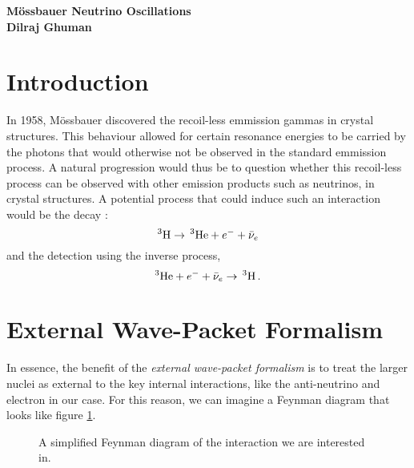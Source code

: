 \documentclass[10pt]{article}
\begin{document}
\begin{center}
  {\Large \bf M\"{o}ssbauer Neutrino Oscillations}\\
  {\small \bf Dilraj Ghuman}
\end{center}
\vspace{2em}

\section{Introduction}

In 1958, M\"{o}ssbauer discovered the recoil-less emmission gammas in crystal structures. This behaviour allowed for certain resonance energies to be carried by the photons that would otherwise not be observed in the standard emmission process. A natural progression would thus be to question whether this recoil-less process can be observed with other emission products such as neutrinos, in crystal structures. A potential process that could induce such an interaction would be the decay :
\[^{3} \textnormal{H} \to\,  ^{3}\textnormal{He} + e^{-} + \bar{\nu}_{e}\]
and the detection using the inverse process,
\[^{3}\textnormal{He} + e^{-} + \bar{\nu}_{e} \to\, ^{3} \textnormal{H}\, .\]

\section{External Wave-Packet Formalism}
In essence, the benefit of the \textit{external wave-packet formalism} is to treat the larger nuclei as external to the key internal interactions, like the anti-neutrino and electron in our case. For this reason, we can imagine a Feynman diagram that looks like figure \ref{fig:feyn}.


\begin{figure}[h]
  \centering
    \caption{A simplified Feynman diagram of the interaction we are interested in.}
    \label{fig:feyn}
\end{figure}
\end{document}
